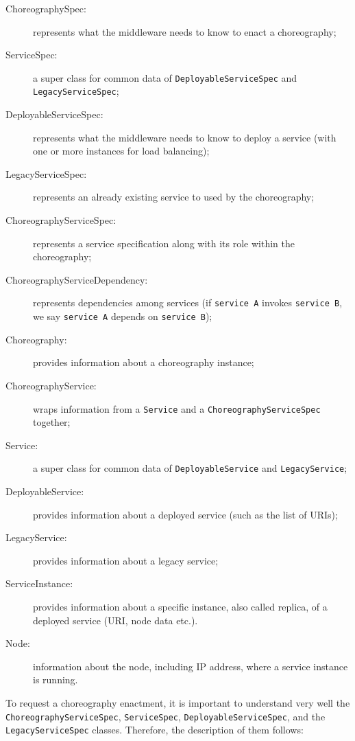 \documentclass[a4paper, 10pt]{article}
\begin{document}
\begin{description}
\item [ChoreographySpec:] represents what the middleware needs to know to enact a choreography;
\item [ServiceSpec:] a super class for common data of \verb!DeployableServiceSpec! and \verb!LegacyServiceSpec!;
\item [DeployableServiceSpec:] represents what the middleware needs to know to deploy a service (with one or more instances for load balancing); 
\item [LegacyServiceSpec:] represents an already existing service to used by the choreography;
\item [ChoreographyServiceSpec:] represents a service specification along with its role within the choreography;
\item [ChoreographyServiceDependency:] represents dependencies among services (if \verb!service A! invokes \verb!service B!, we say \verb!service A! depends on \verb!service B!);
\item [Choreography:] provides information about a choreography instance;
\item [ChoreographyService:] wraps information from a \verb!Service! and a \verb!ChoreographyServiceSpec! together;
\item [Service:] a super class for common data of \verb!DeployableService! and \verb!LegacyService!;
\item [DeployableService:] provides information about a deployed service (such as the list of URIs);
\item [LegacyService:] provides information about a legacy service;
\item [ServiceInstance:] provides information about a specific instance, also called replica, of a deployed service (URI, node data etc.). 
\item [Node:] information about the node, including IP address, where a service instance is running.
\end{description}

To request a choreography enactment, it is important to understand very well the \verb!ChoreographyServiceSpec!, \verb!ServiceSpec!, \verb!DeployableServiceSpec!, and the \verb!LegacyServiceSpec! classes. Therefore, the description of them follows:
\end{document}
